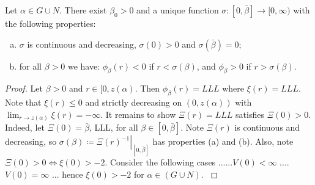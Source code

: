 \newpage
\begin{lemma}Let $\alpha\in G\cup N$. There exist $\beta_0>0$ and a unique function $\sigma:[0,\bar\beta]\to[0,\infty)$ with the following properties: \begin{enumerate}[(a)]
	\item  $\sigma$ is continuous and decreasing, $\sigma(0)>0$ and $\sigma(\bar\beta)=0$;
    \item for all $\beta>0$ we have: $\phi_\beta(r)<0$ if $r<\sigma(\beta)$, and $\phi_\beta>0$ if $r>\sigma(\beta)$.
\end{enumerate}
\begin{proof} 
{\color{gray} Let $\beta>0$ and $r\in[0,z(\alpha)$. Then $\phi_{\beta}(r)=LLL$ where $\xi(r)=LLL$. Note that $\xi(r)\leq0$ and strictly decreasing on $(0,z(\alpha))$ with $\lim_{r\to z(\alpha)}\xi(r)=-\infty$. It remains to show $\Xi(r)=LLL$ satisfies $\Xi(0)>0$. Indeed, let $\Xi(0)=\bar\beta$, LLL, for all $\beta\in[0,\bar\beta]$. Note $\Xi(r)$ is continuous and decreasing, so $\sigma(\beta)\coloneqq\left.\Xi(r)^{-1}\right|_{[0,\bar\beta]}$ has properties (a) and (b). Also, note $\Xi(0)>0\iff\xi(0)>-2$. Consider the following cases ......$V(0)<\infty$ .... $V(0)=\infty$ ... hence $\xi(0)>-2$ for $\alpha\in(G\cup N)$. }
\end{proof}
\end{lemma}
